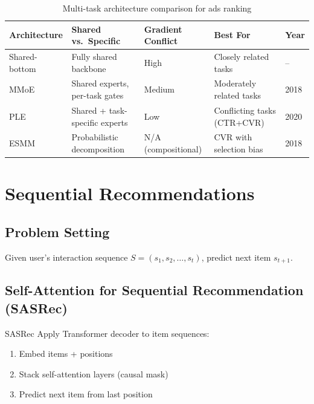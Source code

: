 \begin{table}[H]
\centering
\caption{Multi-task architecture comparison for ads ranking}
\begin{tabularx}{\textwidth}{lXXXl}
\toprule
\textbf{Architecture} & \textbf{Shared vs.\ Specific} & \textbf{Gradient Conflict} & \textbf{Best For} & \textbf{Year} \\
\midrule
Shared-bottom & Fully shared backbone & High & Closely related tasks & -- \\
MMoE & Shared experts, per-task gates & Medium & Moderately related tasks & 2018 \\
PLE & Shared + task-specific experts & Low & Conflicting tasks (CTR+CVR) & 2020 \\
ESMM & Probabilistic decomposition & N/A (compositional) & CVR with selection bias & 2018 \\
\bottomrule
\end{tabularx}
\end{table}

\section{Sequential Recommendations}
\label{sr:sec:sequential_recsys}

\subsection{Problem Setting}

Given user's interaction sequence $S = (s_1, s_2, \ldots, s_t)$, predict next item $s_{t+1}$.

\subsection{Self-Attention for Sequential Recommendation (SASRec)}

\begin{mathresult}{SASRec}
Apply Transformer decoder to item sequences:
\begin{enumerate}
    \item Embed items + positions
    \item Stack self-attention layers (causal mask)
    \item Predict next item from last position
\end{enumerate}
\end{mathresult}

